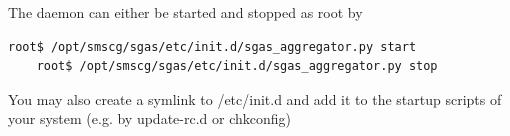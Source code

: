 The daemon can either be started and stopped  as root by 

\begin{verbatim}root$ /opt/smscg/sgas/etc/init.d/sgas_aggregator.py start
	root$ /opt/smscg/sgas/etc/init.d/sgas_aggregator.py stop
 \end{verbatim}
 
 You may also create a symlink to /etc/init.d and add it to the startup scripts of your system (e.g. by update-rc.d or chkconfig)




 